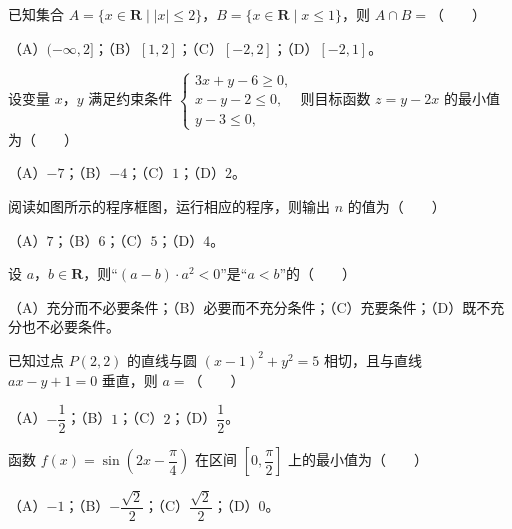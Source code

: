 

\begin{question}
已知集合 $A=\{x\in\mathbf R\mid |x|\leqslant2\}$，$B=\{x\in\mathbf R\mid x\leqslant1\}$，则 $A\cap B=$\mbox{（　　）}

（A）$(-\infty,2]$；（B）$[1,2]$；（C）$[-2,2]$；（D）$[-2,1]$。

\end{question}
\begin{question}
设变量 $x$，$y$ 满足约束条件 $\begin{cases}3x+y-6\geqslant0,\\ x-y-2\leqslant0,\\ y-3\leqslant0,\end{cases}$ 则目标函数 $z=y-2x$ 的最小值为\mbox{（　　）}

（A）$-7$；（B）$-4$；（C）$1$；（D）$2$。

\Needspace{0.4\textheight}
\end{question}
\begin{question}
阅读如图所示的程序框图，运行相应的程序，则输出 $n$ 的值为\mbox{（　　）}
\nopagebreak[4]
\begin{center}\end{center}
\nopagebreak[4]
（A）$7$；（B）$6$；（C）$5$；（D）$4$。

\end{question}
\begin{question}
设 $a$，$b\in\mathbf R$，则“$(a-b)\cdot a^2<0$”是“$a<b$”的\mbox{（　　）}

（A）充分而不必要条件；（B）必要而不充分条件；（C）充要条件；（D）既不充分也不必要条件。

\end{question}
\begin{question}
已知过点 $P(2,2)$ 的直线与圆 $(x-1)^2+y^2=5$ 相切，且与直线 $ax-y+1=0$ 垂直，则 $a=$\mbox{（　　）}

（A）$-\dfrac12$；（B）$1$；（C）$2$；（D）$\dfrac12$。

\end{question}
\begin{question}
函数 $f(x)=\sin\left(2x-\dfrac\pi4\right)$ 在区间 $\left[0,\dfrac\pi2\right]$ 上的最小值为\mbox{（　　）}

（A）$-1$；（B）$-\dfrac{\sqrt2}2$；（C）$\dfrac{\sqrt2}2$；（D）$0$。

\end{question}
